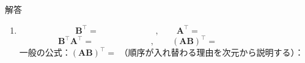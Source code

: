 \documentclass[a4paper,dvipdfmx]{jsarticle}
\newcommand{\提出期限}{2026年10月12日（月）}
\newcommand{\学籍番号}{0000000}
\newcommand{\氏名}{氏名を書く}
\newcommand{\提出日}{2026年10月12日}
\newenvironment{answer}{\begin{itembox}[l]{解答}}{\end{itembox}}
\begin{document}
\begin{enumerate}
\begin{answer}
\begin{enumerate}
          \begin{align*}
            (\bm{A}\bm{B})_{11} &= \bm{r}_1^\top\bm{c}_1 = &
            (\bm{A}\bm{B})_{12} &= \bm{r}_1^\top\bm{c}_2 = \\
            (\bm{A}\bm{B})_{13} &= \bm{r}_1^\top\bm{c}_3 = &
            (\bm{A}\bm{B})_{21} &= \bm{r}_2^\top\bm{c}_1 = \\
            (\bm{A}\bm{B})_{22} &= \bm{r}_2^\top\bm{c}_2 = &
            (\bm{A}\bm{B})_{23} &= \bm{r}_2^\top\bm{c}_3 =
          \end{align*}
          \begin{equation*}
            \bm{A}\bm{B} =
          \end{equation*}
          この結果になる理由（$\bm{A}$ がどんな行列か）：
        \item
          \begin{equation*}
            \bm{B}^\top = \phantom{XXXXXXXX}, \qquad \bm{A}^\top = \phantom{XXXXXXXX}
          \end{equation*}
          \begin{equation*}
            \bm{B}^\top \bm{A}^\top = \phantom{XXXXXXXX}, \qquad (\bm{A}\bm{B})^\top = \phantom{XXXXXXXX}
          \end{equation*}
          一般の公式：$(\bm{A}\bm{B})^\top = $ \phantom{XXXXXXXX}
          （順序が入れ替わる理由を次元から説明する）：
      \end{enumerate}
    \end{answer}


\end{enumerate}
\end{document}
